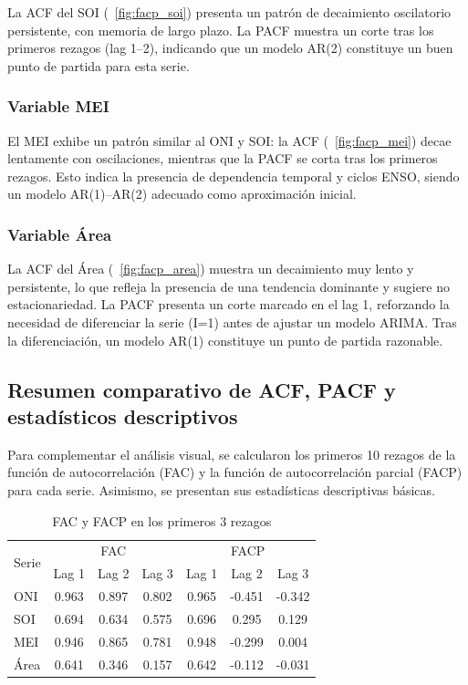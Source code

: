 La ACF del SOI (~\ref{fig:facp_soi}) presenta un patrón de decaimiento oscilatorio persistente, con memoria de 
largo plazo. La PACF muestra un corte tras los primeros rezagos (lag 1–2), indicando que 
un modelo AR(2) constituye un buen punto de partida para esta serie.

\subsubsection{Variable MEI}

El MEI exhibe un patrón similar al ONI y SOI: la ACF (~\ref{fig:facp_mei}) decae lentamente con oscilaciones, 
mientras que la PACF se corta tras los primeros rezagos. Esto indica la presencia de 
dependencia temporal y ciclos ENSO, siendo un modelo AR(1)–AR(2) adecuado como 
aproximación inicial.

\subsubsection{Variable Área}

La ACF del Área (~\ref{fig:facp_area}) muestra un decaimiento muy lento y persistente, lo que refleja la 
presencia de una tendencia dominante y sugiere no estacionariedad. La PACF presenta un 
corte marcado en el lag 1, reforzando la necesidad de diferenciar la serie (I=1) antes de 
ajustar un modelo ARIMA. Tras la diferenciación, un modelo AR(1) constituye un punto de 
partida razonable.

\subsection{Resumen comparativo de ACF, PACF y estadísticos descriptivos}

Para complementar el análisis visual, se calcularon los primeros 10 rezagos de la función 
de autocorrelación (FAC) y la función de autocorrelación parcial (FACP) para cada serie. 
Asimismo, se presentan sus estadísticas descriptivas básicas. 

\begin{table}[H]
    \centering
    \caption{FAC y FACP en los primeros 3 rezagos}
    \label{tab:acf_pacf}
    \begin{tabular}{lcccccc}
        \toprule
        \multirow{2}{*}{Serie} & \multicolumn{3}{c}{FAC} & \multicolumn{3}{c}{FACP} \\
        \cmidrule(lr){2-4} \cmidrule(lr){5-7}
        & Lag 1 & Lag 2 & Lag 3 & Lag 1 & Lag 2 & Lag 3 \\
        \midrule
        ONI  & 0.963 & 0.897 & 0.802 & 0.965 & -0.451 & -0.342 \\
        SOI  & 0.694 & 0.634 & 0.575 & 0.696 &  0.295 &  0.129 \\
        MEI  & 0.946 & 0.865 & 0.781 & 0.948 & -0.299 &  0.004 \\
        Área & 0.641 & 0.346 & 0.157 & 0.642 & -0.112 & -0.031 \\
        \bottomrule
    \end{tabular}
\end{table}

